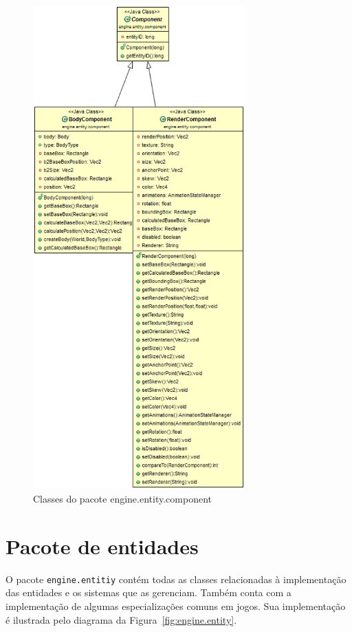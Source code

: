 \documentclass[12pt, 
openright, 
oneside, 
a4paper,    
brazil]{facom-ufu-abntex2}
\begin{document}
\begin{figure}[H]
	\centering
	\includegraphics[width=22em]{imagens/engine.entity.component.png}
	\caption{Classes do pacote engine.entity.component\label{fig:eng.comp}}
\end{figure}

\section{Pacote de entidades}

O pacote \texttt{engine.entitiy} contém todas as classes relacionadas à implementação das entidades e os sistemas que as gerenciam. Também conta com a implementação de algumas especializações comuns em jogos.
Sua implementação é ilustrada pelo diagrama da Figura~\ref{fig:engine.entity}.
\end{document}
